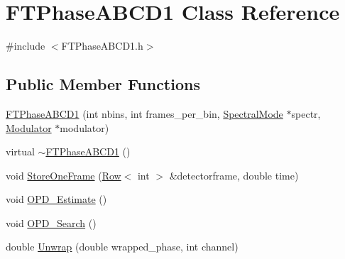 \hypertarget{classFTPhaseABCD1}{
\section{FTPhaseABCD1 Class Reference}
\label{classFTPhaseABCD1}
}


{\ttfamily \#include $<$FTPhaseABCD1.h$>$}

\subsection*{Public Member Functions}
\begin{DoxyCompactItemize}
\item 
\hyperlink{classFTPhaseABCD1_a5cbce7f05ad5e81f40f3ab40ddb3faf0}{FTPhaseABCD1} (int nbins, int frames\_\-per\_\-bin, \hyperlink{classSpectralMode}{SpectralMode} $\ast$spectr, \hyperlink{classModulator}{Modulator} $\ast$modulator)
\item 
virtual \hyperlink{classFTPhaseABCD1_adca39b254b058fc6ebc624354bec5255}{$\sim$FTPhaseABCD1} ()
\item 
void \hyperlink{classFTPhaseABCD1_a3af0de42c400aeed38d77b2edf0e77e7}{StoreOneFrame} (\hyperlink{classRow}{Row}$<$ int $>$ \&detectorframe, double time)
\item 
void \hyperlink{classFTPhaseABCD1_a2b378a7f7486447bd702fece1f2b6ba3}{OPD\_\-Estimate} ()
\item 
void \hyperlink{classFTPhaseABCD1_a16dbd37c05bd96bebab3a22d8e98fd5d}{OPD\_\-Search} ()
\item 
double \hyperlink{classFTPhaseABCD1_ad0d37735d29375d33bf1f9e5f349a706}{Unwrap} (double wrapped\_\-phase, int channel)
\end{DoxyCompactItemize}
